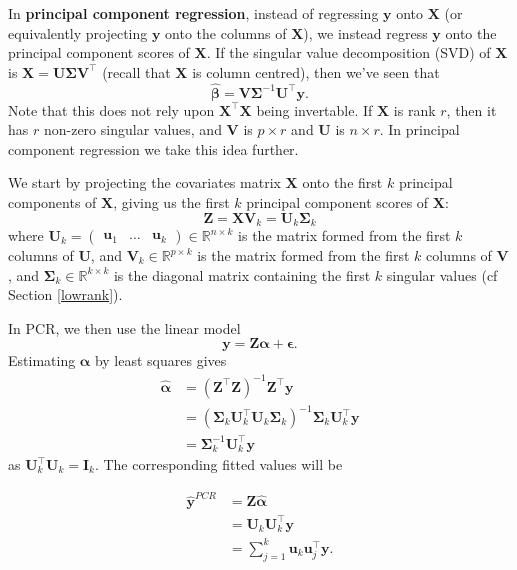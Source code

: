\documentclass[
]{book}
\theoremstyle{definition}
\theoremstyle{definition}
\theoremstyle{definition}
\theoremstyle{definition}
\theoremstyle{remark}
\begin{document}
In \textbf{principal component regression}, instead of regressing \(\mathbf y\) onto \(\mathbf X\) (or equivalently projecting \(\mathbf y\) onto the columns of \(\mathbf X\)), we instead regress \(\mathbf y\) onto the principal component scores of \(\mathbf X\).
If the singular value decomposition (SVD) of \(\mathbf X\) is \(\mathbf X= \mathbf U\boldsymbol{\Sigma}\mathbf V^\top\) (recall that \(\mathbf X\) is column centred), then we've seen that
\[\hat{\boldsymbol \beta}= \mathbf V\boldsymbol{\Sigma}^{-1}\mathbf U^\top \mathbf y.\]
Note that this does not rely upon \(\mathbf X^\top\mathbf X\) being invertable. If \(\mathbf X\) is rank \(r\), then it has \(r\) non-zero singular values, and \(\mathbf V\) is \(p\times r\) and \(\mathbf U\) is \(n \times r\). In principal component regression we take this idea further.

We start by projecting the covariates matrix \(\mathbf X\) onto the first \(k\) principal components of \(\mathbf X\), giving us the first \(k\) principal component scores of \(\mathbf X\):
\[\mathbf Z= \mathbf X\mathbf V_k= \mathbf U_k \boldsymbol{\Sigma}_k\]
where \(\mathbf U_k=\begin{pmatrix}\mathbf u_1&\ldots & \mathbf u_k\end{pmatrix} \in \mathbb{R}^{n \times k}\) is the matrix formed from the first \(k\) columns of \(\mathbf U\), and \(\mathbf V_k\in \mathbb{R}^{p \times k}\) is the matrix formed from the first \(k\) columns of \(\mathbf V\), and \(\boldsymbol{\Sigma}_k\in \mathbb{R}^{k \times k}\) is the diagonal matrix containing the first \(k\) singular values (cf Section \ref{lowrank}).

In PCR, we then use the linear model
\[\mathbf y= \mathbf Z\boldsymbol \alpha+\boldsymbol \epsilon.\]
Estimating \(\boldsymbol \alpha\) by least squares gives
\begin{align*}
\hat{\boldsymbol \alpha} &= (\mathbf Z^\top \mathbf Z)^{-1}\mathbf Z^\top \mathbf y\\
&= (\boldsymbol{\Sigma}_k \mathbf U_k^\top \mathbf U_k\boldsymbol{\Sigma}_k)^{-1}\boldsymbol{\Sigma}_k \mathbf U_k^\top \mathbf y\\
&=\boldsymbol{\Sigma}_k^{-1}\mathbf U_k^\top \mathbf y
\end{align*}
as \(\mathbf U_k^\top\mathbf U_k =\mathbf I_k\). The corresponding fitted values will be

\begin{align}
\hat{\mathbf y}^{PCR} &= \mathbf Z\hat{\boldsymbol \alpha} \\
&= \mathbf U_k \mathbf U_k^\top \mathbf y\\
&=\sum_{j=1}^k \mathbf u_k \mathbf u_j^\top \mathbf y.
\end{align}
\end{document}
